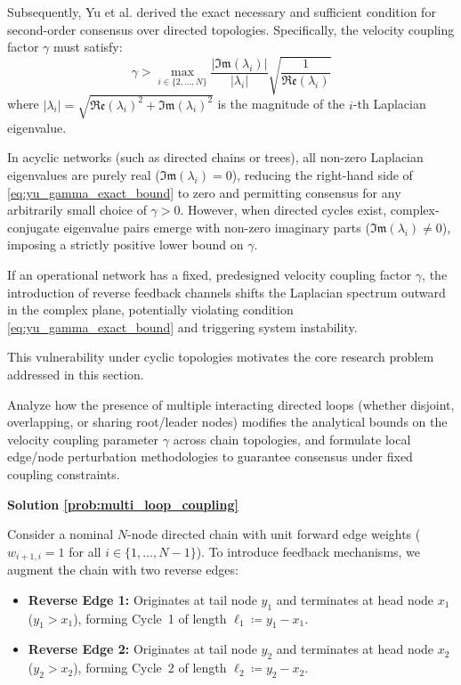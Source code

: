 \documentclass[openright,twoside]{iitbthesis}
\begin{document}
Subsequently, Yu et al. derived the exact necessary and sufficient condition for second-order consensus over directed topologies. Specifically, the velocity coupling factor $\gamma$ must satisfy:
\begin{equation}\label{eq:yu_gamma_exact_bound}
    \gamma > \max_{i \in \{2, \dots, N\}} \frac{|\mathfrak{Im}(\lambda_i)|}{|\lambda_i|} \sqrt{\frac{1}{\mathfrak{Re}(\lambda_i)}}
\end{equation}
where $|\lambda_i| = \sqrt{\mathfrak{Re}(\lambda_i)^2 + \mathfrak{Im}(\lambda_i)^2}$ is the magnitude of the $i$-th Laplacian eigenvalue.

In acyclic networks (such as directed chains or trees), all non-zero Laplacian eigenvalues are purely real ($\mathfrak{Im}(\lambda_i) = 0$), reducing the right-hand side of \eqref{eq:yu_gamma_exact_bound} to zero and permitting consensus for any arbitrarily small choice of $\gamma > 0$. However, when directed cycles exist, complex-conjugate eigenvalue pairs emerge with non-zero imaginary parts ($\mathfrak{Im}(\lambda_i) \neq 0$), imposing a strictly positive lower bound on $\gamma$. 

If an operational network has a fixed, predesigned velocity coupling factor $\gamma$, the introduction of reverse feedback channels shifts the Laplacian spectrum outward in the complex plane, potentially violating condition \eqref{eq:yu_gamma_exact_bound} and triggering system instability.

This vulnerability under cyclic topologies motivates the core research problem addressed in this section.
\begin{problem}\label{prob:multi_loop_coupling}
    Analyze how the presence of multiple interacting directed loops (whether disjoint, overlapping, or sharing root/leader nodes) modifies the analytical bounds on the velocity coupling parameter $\gamma$ across chain topologies, and formulate local edge/node perturbation methodologies to guarantee consensus under fixed coupling constraints.
\end{problem}
\noindent \textbf{Solution \ref{prob:multi_loop_coupling}}

Consider a nominal $N$-node directed chain with unit forward edge weights ($w_{i+1, i} = 1$ for all $i \in \{1, \dots, N-1\}$). To introduce feedback mechanisms, we augment the chain with two reverse edges:
\begin{itemize}
    \item \textbf{Reverse Edge 1:} Originates at tail node $y_1$ and terminates at head node $x_1$ ($y_1 > x_1$), forming Cycle~1 of length $\ell_1 \coloneqq y_1 - x_1$.
    \item \textbf{Reverse Edge 2:} Originates at tail node $y_2$ and terminates at head node $x_2$ ($y_2 > x_2$), forming Cycle~2 of length $\ell_2 \coloneqq y_2 - x_2$.
\end{itemize}
\end{document}

